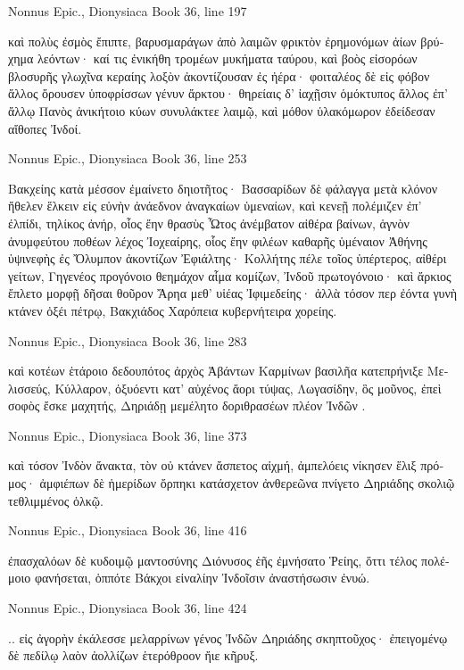 \documentclass[12pt,letterpaper,twoside,final]{memoir}
\begin{document}
\begin{greek}
Nonnus Epic., Dionysiaca 
Book 36, line 197

καὶ πολὺς ἐσμὸς ἔπιπτε, βαρυσμαράγων ἀπὸ λαιμῶν 
φρικτὸν ἐρημονόμων ἀίων βρύχημα λεόντων· 
καί τις ἐνικήθη τρομέων μυκήματα ταύρου, 
καὶ βοὸς εἰσορόων βλοσυρῆς γλωχῖνα κεραίης 
λοξὸν ἀκοντίζουσαν ἐς ἠέρα· φοιταλέος δὲ 
εἰς φόβον ἄλλος ὄρουσεν ὑποφρίσσων γένυν ἄρκτου·   
θηρείαις δ' ἰαχῇσιν ὁμόκτυπος ἄλλος ἐπ' ἄλλῳ 
Πανὸς ἀνικήτοιο κύων συνυλάκτεε λαιμῷ, 
καὶ μόθον ὑλακόμωρον ἐδείδεσαν αἴθοπες Ἰνδοί. 



Nonnus Epic., Dionysiaca 
Book 36, line 253

Βακχείης κατὰ μέσσον ἐμαίνετο δηιοτῆτος· 
Βασσαρίδων δὲ φάλαγγα μετὰ κλόνον ἤθελεν ἕλκειν 
εἰς εὐνὴν ἀνάεδνον ἀναγκαίων ὑμεναίων, 
καὶ κενεῇ πολέμιζεν ἐπ' ἐλπίδι, τηλίκος ἀνήρ, 
οἷος ἔην θρασὺς Ὦτος ἀνέμβατον αἰθέρα βαίνων, 
ἁγνὸν ἀνυμφεύτου ποθέων λέχος Ἰοχεαίρης, 
οἷος ἔην φιλέων καθαρῆς ὑμέναιον Ἀθήνης 
ὑψινεφὴς ἐς Ὄλυμπον ἀκοντίζων Ἐφιάλτης· 
Κολλήτης πέλε τοῖος ὑπέρτερος, αἰθέρι γείτων, 
Γηγενέος προγόνοιο θεημάχον αἷμα κομίζων, 
Ἰνδοῦ πρωτογόνοιο· καὶ ἄρκιος ἔπλετο μορφῇ 
δῆσαι θοῦρον Ἄρηα μεθ' υἱέας Ἰφιμεδείης· 
ἀλλὰ τόσον περ ἐόντα γυνὴ κτάνεν ὀξέι πέτρῳ, 
Βακχιάδος Χαρόπεια κυβερνήτειρα χορείης. 



Nonnus Epic., Dionysiaca 
Book 36, line 283

καὶ κοτέων ἑτάροιο δεδουπότος ἀρχὸς Ἀβάντων 
Καρμίνων βασιλῆα κατεπρήνιξε Μελισσεύς, 
Κύλλαρον, ὀξυόεντι κατ' αὐχένος ἄορι τύψας, 
Λωγασίδην, ὃς μοῦνος, ἐπεὶ σοφὸς ἔσκε μαχητής, 
Δηριάδῃ μεμέλητο δοριθρασέων πλέον Ἰνδῶν . 



Nonnus Epic., Dionysiaca 
Book 36, line 373

καὶ τόσον Ἰνδὸν ἄνακτα, τὸν οὐ κτάνεν ἄσπετος αἰχμή, 
ἀμπελόεις νίκησεν ἕλιξ πρόμος· ἀμφιέπων δὲ 
ἡμερίδων ὄρπηκι κατάσχετον ἀνθερεῶνα 
πνίγετο Δηριάδης σκολιῷ τεθλιμμένος ὁλκῷ. 



Nonnus Epic., Dionysiaca 
Book 36, line 416

                          ἐπασχαλόων δὲ κυδοιμῷ 
μαντοσύνης Διόνυσος ἑῆς ἐμνήσατο Ῥείης, 
ὅττι τέλος πολέμοιο φανήσεται, ὁππότε Βάκχοι 
εἰναλίην Ἰνδοῖσιν ἀναστήσωσιν ἐνυώ. 



Nonnus Epic., Dionysiaca 
Book 36, line 424

                                                       .. 
εἰς ἀγορὴν ἐκάλεσσε μελαρρίνων γένος Ἰνδῶν 
Δηριάδης σκηπτοῦχος· ἐπειγομένῳ δὲ πεδίλῳ 
λαὸν ἀολλίζων ἑτερόθροον ἤιε κῆρυξ. 




\end{greek}
\end{document}
